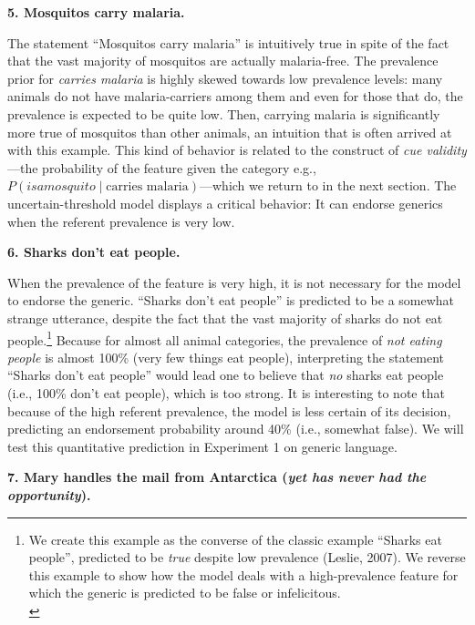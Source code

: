 \documentclass[english,,man,floatsintext]{apa6}
\let\rmarkdownfootnote\footnote%
\def\footnote{\protect\rmarkdownfootnote}
\theoremstyle{definition}
\theoremstyle{definition}
\theoremstyle{definition}
\theoremstyle{remark}
\begin{document}
\textbf{5. Mosquitos carry malaria.}

The statement \enquote{Mosquitos carry malaria} is intuitively true in
spite of the fact that the vast majority of mosquitos are actually
malaria-free. The prevalence prior for \emph{carries malaria} is highly
skewed towards low prevalence levels: many animals do not have
malaria-carriers among them and even for those that do, the prevalence
is expected to be quite low. Then, carrying malaria is significantly
more true of mosquitos than other animals, an intuition that is often
arrived at with this example. This kind of behavior is related to the
construct of \emph{cue validity}---the probability of the feature given
the category e.g.,
\(P({is a mosquito} \mid \text{carries malaria})\)---which we return to
in the next section. The uncertain-threshold model displays a critical
behavior: It can endorse generics when the referent prevalence is very
low.

\textbf{6. Sharks don't eat people.}

When the prevalence of the feature is very high, it is not necessary for
the model to endorse the generic. \enquote{Sharks don't eat people} is
predicted to be a somewhat strange utterance, despite the fact that the
vast majority of sharks do not eat people.\footnote{We create this
  example as the converse of the classic example \enquote{Sharks eat
  people}, predicted to be \emph{true} despite low prevalence (Leslie,
  2007). We reverse this example to show how the model deals with a
  high-prevalence feature for which the generic is predicted to be false
  or infelicitous.\\} Because for almost all animal categories, the
prevalence of \emph{not eating people} is almost 100\% (very few things
eat people), interpreting the statement \enquote{Sharks don't eat
people} would lead one to believe that \emph{no} sharks eat people
(i.e., 100\% don't eat people), which is too strong. It is interesting
to note that because of the high referent prevalence, the model is less
certain of its decision, predicting an endorsement probability around
40\% (i.e., somewhat false). We will test this quantitative prediction
in Experiment 1 on generic language.

\textbf{7. Mary handles the mail from Antarctica (\emph{yet has never
had the opportunity}).}
\end{document}
